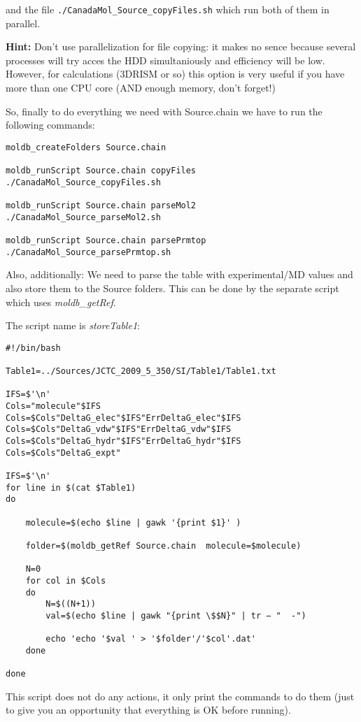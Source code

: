 \documentclass[12pt]{article}
\begin{document}
and the file \verb#./CanadaMol_Source_copyFiles.sh# which run both of them in parallel.

\textbf{Hint:} Don't use parallelization for file copying: it makes no sence because several processes will try acces the HDD simultaniously and efficiency will be low.
However, for calculations (3DRISM or so) this option is very useful if you have more than one CPU core (AND enough memory, don't forget!) 

So, finally to do everything we need with Source.chain we have to run the following commands:

\begin{verbatim}
moldb_createFolders Source.chain

moldb_runScript Source.chain copyFiles
./CanadaMol_Source_copyFiles.sh

moldb_runScript Source.chain parseMol2
./CanadaMol_Source_parseMol2.sh

moldb_runScript Source.chain parsePrmtop
./CanadaMol_Source_parsePrmtop.sh

\end{verbatim}

Also, additionally:
We need to parse the table with experimental/MD values and also store them to the Source folders.
This can be done by the separate script which uses \emph{moldb\_getRef}.

The script name is \emph{storeTable1}:
\begin{verbatim}
#!/bin/bash

Table1=../Sources/JCTC_2009_5_350/SI/Table1/Table1.txt

IFS=$'\n'
Cols="molecule"$IFS
Cols=$Cols"DeltaG_elec"$IFS"ErrDeltaG_elec"$IFS
Cols=$Cols"DeltaG_vdw"$IFS"ErrDeltaG_vdw"$IFS
Cols=$Cols"DeltaG_hydr"$IFS"ErrDeltaG_hydr"$IFS
Cols=$Cols"DeltaG_expt"

IFS=$'\n'
for line in $(cat $Table1)
do
	
	molecule=$(echo $line | gawk '{print $1}' )

	folder=$(moldb_getRef Source.chain  molecule=$molecule)

	N=0
	for col in $Cols
	do
		N=$((N+1))
		val=$(echo $line | gawk "{print \$$N}" | tr − "  -")

		echo 'echo '$val ' > '$folder'/'$col'.dat'
	done

done
\end{verbatim}

This script does not do any actions, it only print the commands to do them (just to give you an opportunity that everything is OK before running).
\end{document}
